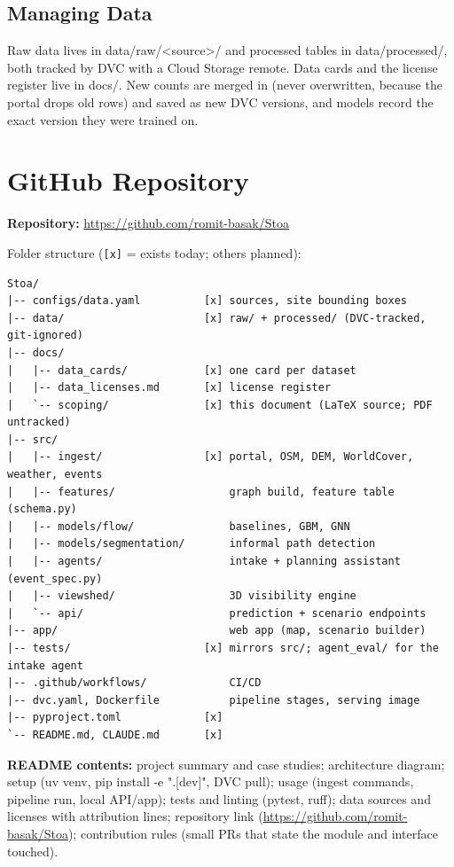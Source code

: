 \documentclass[11pt]{article}
\begin{document}
\subsection{Managing Data}

Raw data lives in data/raw/<source>/ and processed tables in data/processed/, both tracked by DVC with a Cloud Storage remote. Data cards and the license register live in docs/. New counts are merged in (never overwritten, because the portal drops old rows) and saved as new DVC versions, and models record the exact version they were trained on.

\section{GitHub Repository}

\textbf{Repository:} \url{https://github.com/romit-basak/Stoa}

Folder structure (\texttt{[x]} = exists today; others planned):

{\small
\begin{verbatim}
Stoa/
|-- configs/data.yaml          [x] sources, site bounding boxes
|-- data/                      [x] raw/ + processed/ (DVC-tracked, git-ignored)
|-- docs/
|   |-- data_cards/            [x] one card per dataset
|   |-- data_licenses.md       [x] license register
|   `-- scoping/               [x] this document (LaTeX source; PDF untracked)
|-- src/
|   |-- ingest/                [x] portal, OSM, DEM, WorldCover, weather, events
|   |-- features/                  graph build, feature table (schema.py)
|   |-- models/flow/               baselines, GBM, GNN
|   |-- models/segmentation/       informal path detection
|   |-- agents/                    intake + planning assistant (event_spec.py)
|   |-- viewshed/                  3D visibility engine
|   `-- api/                       prediction + scenario endpoints
|-- app/                           web app (map, scenario builder)
|-- tests/                     [x] mirrors src/; agent_eval/ for the intake agent
|-- .github/workflows/             CI/CD
|-- dvc.yaml, Dockerfile           pipeline stages, serving image
|-- pyproject.toml             [x]
`-- README.md, CLAUDE.md       [x]
\end{verbatim}
}

\textbf{README contents:} project summary and case studies; architecture diagram; setup (uv venv, pip install -e ".[dev]", DVC pull); usage (ingest commands, pipeline run, local API/app); tests and linting (pytest, ruff); data sources and licenses with attribution lines; repository link (\url{https://github.com/romit-basak/Stoa}); contribution rules (small PRs that state the module and interface touched).
\end{document}
